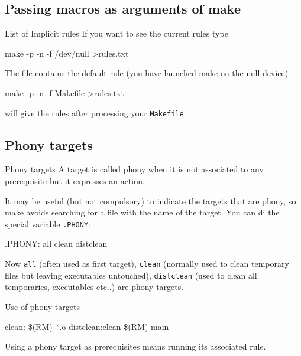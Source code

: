 \documentclass[10pt,aspectratio=169]{beamer}
\begin{document}
\subsection*{Passing macros as arguments of make}

\begin{frame}{List of Implicit rules}
  If you want to see the current rules type 
\begin{semiverbatim}
make -p -n -f /dev/null >rules.txt
\end{semiverbatim}
The file contains the default rule (you have launched make on the null device)
\begin{semiverbatim}
make -p -n -f Makefile >rules.txt
\end{semiverbatim}
will give the rules after processing your \texttt{Makefile}.
\end{frame}

\subsection*{Phony targets}
\begin{frame}{Phony targets}
A target is called \alert{phony} when it is not associated to any prerequisite but it expresses an \alert{action}.

It may be useful (but not compulsory) to indicate the targets that are phony, so
make avoids searching for a file with the name of the target. You can di 
the \alert{special variable} \texttt{.PHONY}:

\begin{semiverbatim}
.PHONY: all clean distclean\newline
\end{semiverbatim}
\vspace*{-0.3cm}
Now \texttt{all} (often used as first target), \texttt{clean} (normally used to clean temporary files but leaving executables untouched), \texttt{distclean} (used to clean all temporaries, executables etc..) are phony targets.
\end{frame}

\begin{frame}{Use of phony targets}

\begin{semiverbatim}
clean:\newline
\phantom{xx} \$(RM) *.o\newline
distclean:clean\newline
\phantom{xx} \$(RM) main
\end{semiverbatim}
\vspace*{-0.3cm}
Using a phony target as prerequisites means \alert{running its associated rule}. 

\end{frame}
\end{document}
